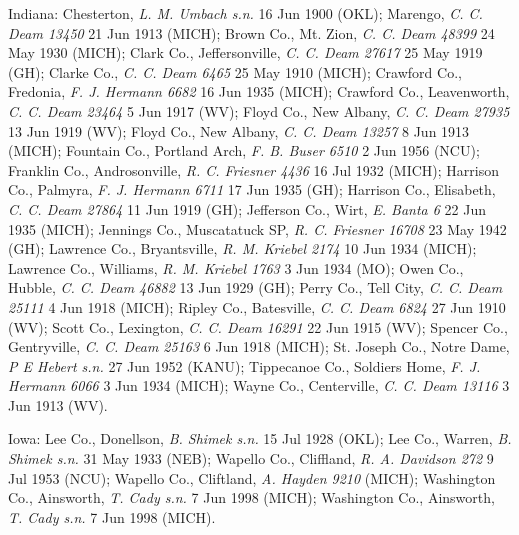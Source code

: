 \documentclass{article}
\begin{document}
Indiana:
Chesterton, \textit{L. M. Umbach s.n.} 16 Jun 1900 (OKL);
Marengo, \textit{C. C. Deam 13450} 21 Jun 1913 (MICH);
Brown Co., Mt. Zion, \textit{C. C. Deam 48399} 24 May 1930 (MICH);
Clark Co., Jeffersonville, \textit{C. C. Deam 27617} 25 May 1919 (GH);
Clarke Co., \textit{C. C. Deam 6465} 25 May 1910 (MICH);
Crawford Co., Fredonia, \textit{F. J. Hermann 6682} 16 Jun 1935 (MICH);
Crawford Co., Leavenworth, \textit{C. C. Deam 23464} 5 Jun 1917 (WV);
Floyd Co., New Albany, \textit{C. C. Deam 27935} 13 Jun 1919 (WV);
Floyd Co., New Albany, \textit{C. C. Deam 13257} 8 Jun 1913 (MICH);
Fountain Co., Portland Arch, \textit{F. B. Buser 6510} 2 Jun 1956 (NCU);
Franklin Co., Androsonville, \textit{R. C. Friesner 4436} 16 Jul 1932 (MICH);
Harrison Co., Palmyra, \textit{F. J. Hermann 6711} 17 Jun 1935 (GH);
Harrison Co., Elisabeth, \textit{C. C. Deam 27864} 11 Jun 1919 (GH);
Jefferson Co., Wirt, \textit{E. Banta 6} 22 Jun 1935 (MICH);
Jennings Co., Muscatatuck SP, \textit{R. C. Friesner 16708} 23 May 1942 (GH);
Lawrence Co., Bryantsville, \textit{R. M. Kriebel 2174} 10 Jun 1934 (MICH);
Lawrence Co., Williams, \textit{R. M. Kriebel 1763} 3 Jun 1934 (MO);
Owen Co., Hubble, \textit{C. C. Deam 46882} 13 Jun 1929 (GH);
Perry Co., Tell City, \textit{C. C. Deam 25111} 4 Jun 1918 (MICH);
Ripley Co., Batesville, \textit{C. C. Deam 6824} 27 Jun 1910 (WV);
Scott Co., Lexington, \textit{C. C. Deam 16291} 22 Jun 1915 (WV);
Spencer Co., Gentryville, \textit{C. C. Deam 25163} 6 Jun 1918 (MICH);
St. Joseph Co., Notre Dame, \textit{P E Hebert s.n.} 27 Jun 1952 (KANU);
Tippecanoe Co., Soldiers Home, \textit{F. J. Hermann 6066} 3 Jun 1934 (MICH);
Wayne Co., Centerville, \textit{C. C. Deam 13116} 3 Jun 1913 (WV).

Iowa:
Lee Co., Donellson, \textit{B. Shimek s.n.} 15 Jul 1928 (OKL);
Lee Co., Warren, \textit{B. Shimek s.n.} 31 May 1933 (NEB);
Wapello Co., Cliffland, \textit{R. A. Davidson 272} 9 Jul 1953 (NCU);
Wapello Co., Cliftland, \textit{A. Hayden 9210}  (MICH);
Washington Co., Ainsworth, \textit{T. Cady s.n.} 7 Jun 1998 (MICH);
Washington Co., Ainsworth, \textit{T. Cady s.n.} 7 Jun 1998 (MICH).
\end{document}
